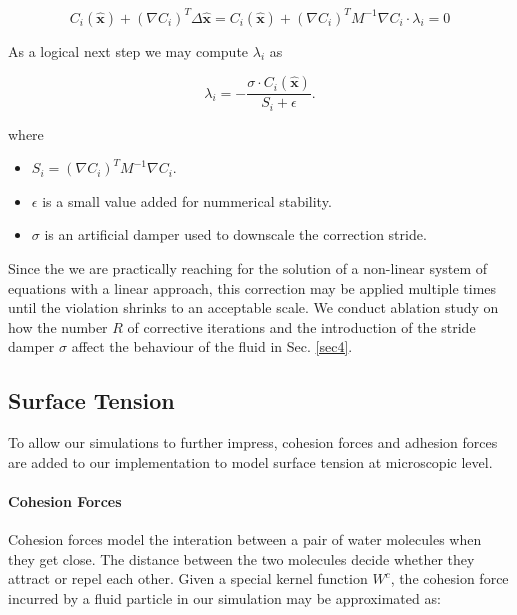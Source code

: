 \documentclass[
	11pt, 
	DIV10,
	ngerman,
	a4paper, 
	oneside, 
	headings=normal, 
	captions=tableheading,
	final, 
	numbers=noenddot
]{scrartcl}
\begin{document}
\begin{equation}
	\label{eq23}
	C_{i}(\hat{\boldsymbol{x}}) + (\nabla C_{i})^{T} \Delta \hat{\boldsymbol{x}} = C_{i}(\hat{\boldsymbol{x}}) + (\nabla C_{i})^{T} M^{-1} \nabla C_{i} \cdot \lambda_{i} = 0
\end{equation}

As a logical next step we may compute $ \lambda_{i} $ as

\begin{equation}
	\label{eq24}
	\lambda_{i} = - \frac{\sigma \cdot C_{i}(\hat{\boldsymbol{x}})}{S_{i} + \epsilon}.
\end{equation}

where

\begin{itemize}
    \item $ S_{i} = (\nabla C_{i})^{T} M^{-1} \nabla C_{i} $.
    \item $ \epsilon $ is a small value added for nummerical stability.
    \item $ \sigma $ is an artificial damper used to downscale the correction stride.
\end{itemize}

Since the we are practically reaching for the solution of a non-linear system of equations with a linear approach, this correction may be applied multiple times until the violation shrinks to an acceptable scale. We conduct ablation study on how the number $ R $ of corrective iterations and the introduction of the stride damper $ \sigma $ affect the behaviour of the fluid in Sec. \ref{sec4}.

\subsection{Surface Tension}

To allow our simulations to further impress, cohesion forces and adhesion forces are added to our implementation to model surface tension at microscopic level.

\paragraph{Cohesion Forces}

Cohesion forces model the interation between a pair of water molecules when they get close. The distance between the two molecules decide whether they attract or repel each other. Given a special kernel function $ W^{c} $, the cohesion force incurred by a fluid particle in our simulation may be approximated as:
\end{document}
